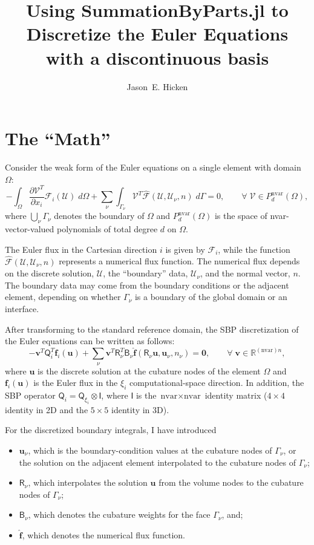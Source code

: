 \documentclass[11pt]{article} %
\title{Using SummationByParts.jl to Discretize the Euler Equations with a
  discontinuous basis}
\author{Jason~E. Hicken}
\newcommand{\vfc}[1]{\ensuremath{\mathcal{#1}}}
\newcommand{\mat}[1]{\ensuremath{\mathsf{#1}}}
\newcommand{\Q}[1]{\mat{Q}_{#1}}
\newcommand{\B}[0]{\mat{B}}
\newcommand{\R}[0]{\mat{R}}
\begin{document}
\maketitle

\section*{The ``Math''}

Consider the weak form of the Euler equations on a single element with domain
$\Omega$:
\begin{equation*}
  - \int_{\Omega}  \frac{\partial \vfc{V}^{T}}{\partial x_{i}} 
  \vfc{F}_{i}(\vfc{U}) \; d\Omega
  + \sum_{\nu} \int_{\Gamma_{\nu}} \vfc{V}^{T} \hat{\vfc{F}}(\vfc{U},\vfc{U}_{\nu},n)  \; d\Gamma
  = 0,\qquad \forall\; \vfc{V} \in P_{d}^{\text{nvar}}(\Omega),
\end{equation*}
where $\bigcup_{\nu} \Gamma_{\nu}$ denotes the boundary of $\Omega$ and
$P_{d}^{\text{nvar}}(\Omega)$ is the space of nvar-vector-valued polynomials of
total degree $d$ on $\Omega$.

The Euler flux in the Cartesian direction $i$ is given by $\vfc{F}_{i}$, while
the function $\hat{\vfc{F}}(\vfc{U}, \vfc{U}_{\nu}, n)$ represents a numerical
flux function.  The numerical flux depends on the discrete solution, $\vfc{U}$,
the ``boundary'' data, $\vfc{U}_{\nu}$, and the normal vector, $n$.  The
boundary data may come from the boundary conditions or the adjacent element,
depending on whether $\Gamma_{\nu}$ is a boundary of the global domain or an
interface.

After transforming to the standard reference domain, the SBP discretization of
the Euler equations can be written as follows:
\begin{equation*}
  -\bm{v}^{T} \Q{i}^{T} \bm{f}_{i}(\bm{u}) + \sum_{\nu} \bm{v}^{T} \R_{\nu}^{T} \B_{\nu}
  \hat{\bm{f}}(\R_{\nu} \bm{u}, \bm{u}_{\nu},n_{\nu}) = \bm{0},
  \qquad \forall\; \bm{v} \in \mathbb{R}^{(\text{nvar})n},
\end{equation*}
where $\bm{u}$ is the discrete solution at the cubature nodes of the element
$\Omega$ and $\bm{f}_{i}(\bm{u})$ is the Euler flux in the $\xi_{i}$
computational-space direction.  In addition, the SBP operator $\Q{i} =
\Q{\xi_{i}} \otimes \mat{I}$, where $\mat{I}$ is the $\text{nvar}\times
\text{nvar}$ identity matrix ($4\times 4$ identity in 2D and the $5\times 5$
identity in 3D).

For the discretized boundary integrals, I have introduced 
\begin{itemize}
\item $\bm{u}_{\nu}$, which is the boundary-condition values at the cubature
  nodes of $\Gamma_{\nu}$, or the solution on the adjacent element interpolated
  to the cubature nodes of $\Gamma_{\nu}$;
\item $\R_{\nu}$, which interpolates the solution $\bm{u}$ from the volume nodes
  to the cubature nodes of $\Gamma_{\nu}$;
\item $\B_{\nu}$, which denotes the cubature weights for the face $\Gamma_{\nu}$, and;
\item $\hat{\bm{f}}$, which denotes the numerical flux function.
\end{itemize}
\end{document}
